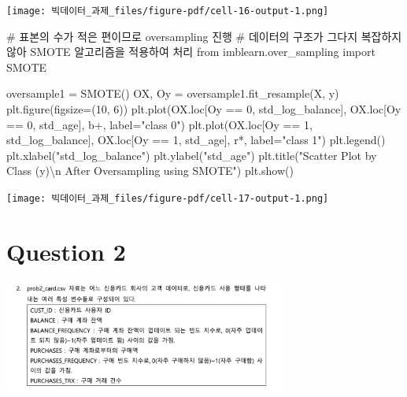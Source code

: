 \documentclass[
  a4paper,
  DIV=11,
  numbers=noendperiod]{scrreprt}
\newenvironment{Shaded}{\begin{snugshade}}{\end{snugshade}}
\newcommand{\CharTok}[1]{\textcolor[rgb]{0.13,0.47,0.30}{#1}}
\newcommand{\CommentTok}[1]{\textcolor[rgb]{0.37,0.37,0.37}{#1}}
\newcommand{\DecValTok}[1]{\textcolor[rgb]{0.68,0.00,0.00}{#1}}
\newcommand{\ImportTok}[1]{\textcolor[rgb]{0.00,0.46,0.62}{#1}}
\newcommand{\NormalTok}[1]{\textcolor[rgb]{0.00,0.23,0.31}{#1}}
\newcommand{\OperatorTok}[1]{\textcolor[rgb]{0.37,0.37,0.37}{#1}}
\newcommand{\StringTok}[1]{\textcolor[rgb]{0.13,0.47,0.30}{#1}}
\begin{document}
\texttt{[image: 빅데이터\_과제\_files/figure-pdf/cell-16-output-1.png]}

\begin{Shaded}
\begin{Highlighting}[]
\CommentTok{\# 표본의 수가 적은 편이므로 oversampling 진행}
\CommentTok{\# 데이터의 구조가 그다지 복잡하지 않아 SMOTE 알고리즘을 적용하여 처리}
\ImportTok{from}\NormalTok{ imblearn.over\_sampling }\ImportTok{import}\NormalTok{ SMOTE}

\NormalTok{oversample1 }\OperatorTok{=}\NormalTok{ SMOTE()}
\NormalTok{OX, Oy }\OperatorTok{=}\NormalTok{ oversample1.fit\_resample(X, y)}
\NormalTok{plt.figure(figsize}\OperatorTok{=}\NormalTok{(}\DecValTok{10}\NormalTok{, }\DecValTok{6}\NormalTok{))}
\NormalTok{plt.plot(OX.loc[Oy }\OperatorTok{==} \DecValTok{0}\NormalTok{, }\StringTok{\textquotesingle{}std\_log\_balance\textquotesingle{}}\NormalTok{], OX.loc[Oy }\OperatorTok{==} \DecValTok{0}\NormalTok{, }\StringTok{\textquotesingle{}std\_age\textquotesingle{}}\NormalTok{], }\StringTok{\textquotesingle{}b+\textquotesingle{}}\NormalTok{, label}\OperatorTok{=}\StringTok{"class 0"}\NormalTok{)}
\NormalTok{plt.plot(OX.loc[Oy }\OperatorTok{==} \DecValTok{1}\NormalTok{, }\StringTok{\textquotesingle{}std\_log\_balance\textquotesingle{}}\NormalTok{], OX.loc[Oy }\OperatorTok{==} \DecValTok{1}\NormalTok{, }\StringTok{\textquotesingle{}std\_age\textquotesingle{}}\NormalTok{], }\StringTok{\textquotesingle{}r*\textquotesingle{}}\NormalTok{, label}\OperatorTok{=}\StringTok{"class 1"}\NormalTok{)}
\NormalTok{plt.legend()}
\NormalTok{plt.xlabel(}\StringTok{"std\_log\_balance"}\NormalTok{)}
\NormalTok{plt.ylabel(}\StringTok{"std\_age"}\NormalTok{)}
\NormalTok{plt.title(}\StringTok{"Scatter Plot by Class (y)}\CharTok{\textbackslash{}n}\StringTok{ After Oversampling using SMOTE"}\NormalTok{)}
\NormalTok{plt.show()}
\end{Highlighting}
\end{Shaded}

\texttt{[image: 빅데이터\_과제\_files/figure-pdf/cell-17-output-1.png]}

\section{Question 2}\label{question-2}

\begin{center}
\includegraphics[width=0.7\textwidth,height=\textheight]{image/bigdata2.png}
\end{center}
\end{document}
